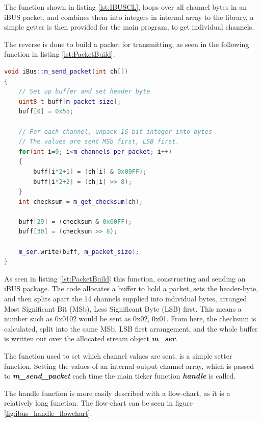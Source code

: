 The function shown in listing \ref{lst:IBUSCL}, loops over all channel bytes in an iBUS packet, and combines them into integers in internal array to the library, a simple getter is then provided for the main program, to get individual channels.

The reverse is done to build a packet for transmitting, as seen in the following function in listing \ref{lst:PacketBuild}.

\begin{lstlisting}[language=C++, caption={Function for constructing and transmitting for iBUS packets. \label{lst:PacketBuild}}]
void iBus::m_send_packet(int ch[])
{
	// Set up buffer and set header byte
	uint8_t buff[m_packet_size];
	buff[0] = 0x55;

	// For each channel, unpack 16 bit integer into bytes
	// The values are sent MSb first, LSB first.
	for(int i=0; i<m_channels_per_packet; i++)
	{
		buff[i*2+1] = (ch[i] & 0x00FF);
		buff[i*2+2] = (ch[i] >> 8);
	}
	int checksum = m_get_checksum(ch);

	buff[29] = (checksum & 0x00FF);
	buff[30] = (checksum >> 8);

	m_ser.write(buff, m_packet_size);
}
\end{lstlisting}

As seen in listing \ref{lst:PacketBuild} this function, constructing and sending an iBUS package. %
The code allocates a buffer to hold a packet, sets the header-byte, and then splits apart the 14 channels supplied into individual bytes, arranged Most Significant Bit (MSb), Less Significant Byte (LSB) first. This means a number such as 0x0102 would be sent as 0x02, 0x01. From here, the checksum is calculated, split into the same MSb, LSB first arrangement, and the whole buffer is written out over the allocated stream object \textbf{\textit{m\_ser}}.

The function used to set which channel values are sent, is a simple setter function. Setting the values of an internal output channel array, which is passed to \textbf{\textit{m\_send\_packet\(\)}} each time the main ticker function \textbf{\textit{handle\(\)}} is called.

The handle function is more easily described with a flow-chart, as it is a relatively long function. The flow-chart can be seen in figure \ref{fig:ibus_handle_flowchart}.

